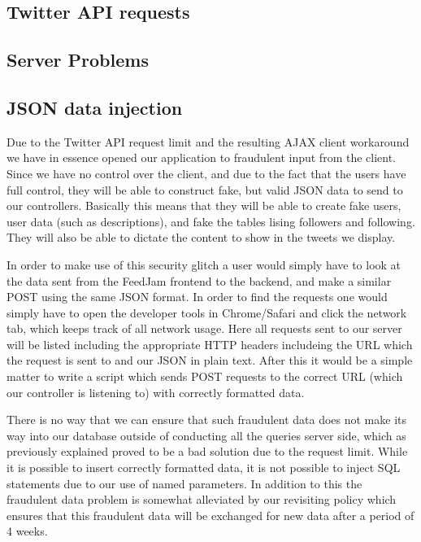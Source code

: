 \subsection{Twitter API requests}

\subsection{Server Problems}

\subsection{JSON data injection}
Due to the Twitter API request limit and the resulting AJAX client workaround we have in essence opened our application to fraudulent input from the client. Since we have no control over the client, and due to the fact that the users have full control, they will be able to construct fake, but valid JSON data to send to our controllers. Basically this means that they will be able to create fake users, user data (such as descriptions), and fake the tables lising followers and following. They will also be able to dictate the content to show in the tweets we display.

In order to make use of this security glitch a user would simply have to look at the data sent from the FeedJam frontend to the backend, and make a similar POST using the same JSON format. In order to find the requests one would simply have to open the developer tools in Chrome/Safari and click the network tab, which keeps track of all network usage. Here all requests sent to our server will be listed including the appropriate HTTP headers includeing the URL which the request is sent to and our JSON in plain text. After this it would be a simple matter to write a script which sends POST requests to the correct URL (which our controller is listening to) with correctly formatted data.

There is no way that we can ensure that such fraudulent data does not make its way into our database outside of conducting all the queries server side, which as previously explained proved to be a bad solution due to the request limit. While it is possible to insert correctly formatted data, it is not possible to inject SQL statements due to our use of named parameters. In addition to this the fraudulent data problem is somewhat alleviated by our revisiting policy which ensures that this fraudulent data will be exchanged for new data after a period of 4 weeks.
